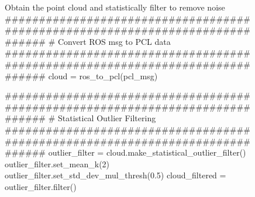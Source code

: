 \documentclass[a4paper]{article}
\begin{document}
\vspace{1cm}

\begin{figure}[h]\scriptsize
\begin{sexylisting}{Obtain the point cloud and statistically filter to remove noise}
##############################################################################
    # Convert ROS msg to PCL data
##############################################################################
    cloud = ros_to_pcl(pcl_msg)

##############################################################################
    # Statistical Outlier Filtering
##############################################################################
    outlier_filter = cloud.make_statistical_outlier_filter()
    outlier_filter.set_mean_k(2)
    outlier_filter.set_std_dev_mul_thresh(0.5)
    cloud_filtered = outlier_filter.filter()
\end{sexylisting}
\end{figure}

\vspace{1cm}
\end{document}
